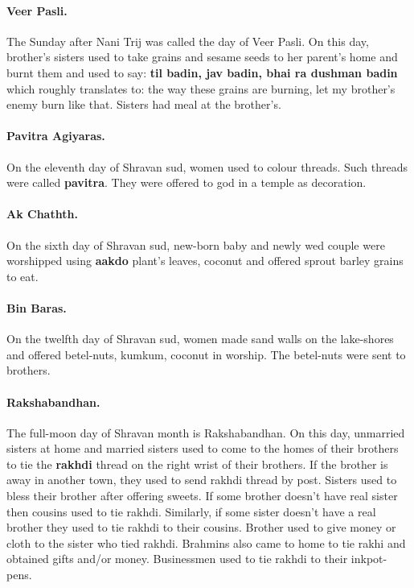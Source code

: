 \paragraph{Veer Pasli.} The Sunday
after Nani Trij was called the day of Veer Pasli. On this day, brother's
sisters used to take grains and sesame seeds to her parent's home and burnt
them and used to say: \textbf{til badin, jav badin, bhai ra dushman badin}
which roughly translates to: the way these grains are burning, let my brother's
enemy burn like that. Sisters had meal at the brother's.
\paragraph{Pavitra
Agiyaras.} On the eleventh day of Shravan sud, women used to colour threads.
Such threads were called \textbf{pavitra}. They were offered to god in a temple
as decoration. 
\paragraph{Ak Chathth.} On the sixth day of Shravan sud,
new-born baby and newly wed couple were worshipped using \textbf{aakdo} plant's
leaves, coconut and offered sprout barley grains to eat. 
\paragraph{Bin
Baras.} On the twelfth day of Shravan sud, women made sand walls on the
lake-shores and offered betel-nuts, kumkum, coconut in worship. The betel-nuts
were sent to brothers.
\paragraph{Rakshabandhan.} The full-moon day of Shravan
month is Rakshabandhan.  On this day, unmarried sisters at home and married
sisters used to come to the homes of their brothers to tie the \textbf{rakhdi}
thread on the right wrist of their brothers. If the brother is away in another
town, they used to send rakhdi thread by post. Sisters used to bless their
brother after offering sweets. If some brother doesn't have real sister then
cousins used to tie rakhdi. Similarly, if some sister  doesn't have a real
brother they used to tie rakhdi to their cousins. Brother used to give money or
cloth to the sister who tied rakhdi.  Brahmins also came to home to tie rakhi
and obtained gifts and/or money.  Businessmen used to tie rakhdi to their
inkpot-pens.  
